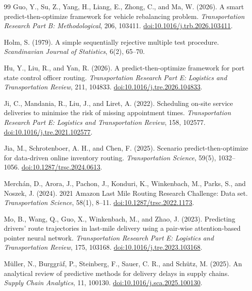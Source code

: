 \documentclass[11pt,a4paper]{article}
\begin{document}
\begin{thebibliography}{99}
Guo, Y., Su, Z., Yang, H., Liang, E., Zhong, C., and Ma, W. (2026).
A smart predict-then-optimize framework for vehicle rebalancing problem.
\emph{Transportation Research Part B: Methodological}, 206, 103411.
\href{https://doi.org/10.1016/j.trb.2026.103411}{doi:10.1016/j.trb.2026.103411}.

Holm, S. (1979).
A simple sequentially rejective multiple test procedure.
\emph{Scandinavian Journal of Statistics}, 6(2), 65--70.

Hu, Y., Liu, R., and Yan, R. (2026).
A predict-then-optimize framework for port state control officer routing.
\emph{Transportation Research Part E: Logistics and Transportation Review}, 211, 104833.
\href{https://doi.org/10.1016/j.tre.2026.104833}{doi:10.1016/j.tre.2026.104833}.

Ji, C., Mandania, R., Liu, J., and Liret, A. (2022).
Scheduling on-site service deliveries to minimise the risk of missing appointment times.
\emph{Transportation Research Part E: Logistics and Transportation Review}, 158, 102577.
\href{https://doi.org/10.1016/j.tre.2021.102577}{doi:10.1016/j.tre.2021.102577}.

Jia, M., Schrotenboer, A. H., and Chen, F. (2025).
Scenario predict-then-optimize for data-driven online inventory routing.
\emph{Transportation Science}, 59(5), 1032--1056.
\href{https://doi.org/10.1287/trsc.2024.0613}{doi:10.1287/trsc.2024.0613}.

Merch\'an, D., Arora, J., Pachon, J., Konduri, K., Winkenbach, M., Parks, S., and Noszek, J. (2024).
2021 Amazon Last Mile Routing Research Challenge: Data set.
\emph{Transportation Science}, 58(1), 8--11.
\href{https://doi.org/10.1287/trsc.2022.1173}{doi:10.1287/trsc.2022.1173}.

Mo, B., Wang, Q., Guo, X., Winkenbach, M., and Zhao, J. (2023).
Predicting drivers' route trajectories in last-mile delivery using a pair-wise attention-based pointer neural network.
\emph{Transportation Research Part E: Logistics and Transportation Review}, 175, 103168.
\href{https://doi.org/10.1016/j.tre.2023.103168}{doi:10.1016/j.tre.2023.103168}.

M\"uller, N., Burggr\"af, P., Steinberg, F., Sauer, C. R., and Sch\"utz, M. (2025).
An analytical review of predictive methods for delivery delays in supply chains.
\emph{Supply Chain Analytics}, 11, 100130.
\href{https://doi.org/10.1016/j.sca.2025.100130}{doi:10.1016/j.sca.2025.100130}.


\end{thebibliography}
\end{document}
